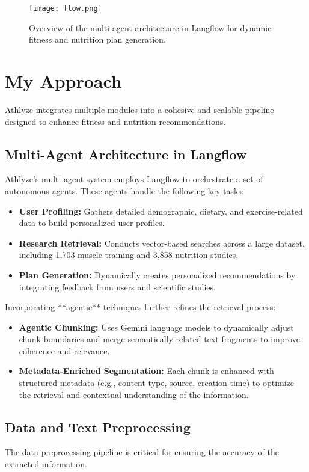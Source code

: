 \documentclass[conference]{IEEEtran}
\begin{document}
\begin{figure}[h]
\centering
\texttt{[image: flow.png]}
\caption{Overview of the multi-agent architecture in Langflow for dynamic fitness and nutrition plan generation.}
\label{fig:flow}
\end{figure}

\section{My Approach}
Athlyze integrates multiple modules into a cohesive and scalable pipeline designed to enhance fitness and nutrition recommendations.

\subsection{Multi-Agent Architecture in Langflow}
Athlyze's multi-agent system employs Langflow to orchestrate a set of autonomous agents. These agents handle the following key tasks:

\begin{itemize}
    \item \textbf{User Profiling:} Gathers detailed demographic, dietary, and exercise-related data to build personalized user profiles.
    \item \textbf{Research Retrieval:} Conducts vector-based searches across a large dataset, including 1,703 muscle training and 3,858 nutrition studies.
    \item \textbf{Plan Generation:} Dynamically creates personalized recommendations by integrating feedback from users and scientific studies.
\end{itemize}

Incorporating **agentic** techniques further refines the retrieval process:
\begin{itemize}
    \item \textbf{Agentic Chunking:} Uses Gemini language models to dynamically adjust chunk boundaries and merge semantically related text fragments to improve coherence and relevance.
    \item \textbf{Metadata-Enriched Segmentation:} Each chunk is enhanced with structured metadata (e.g., content type, source, creation time) to optimize the retrieval and contextual understanding of the information.
\end{itemize}

\subsection{Data and Text Preprocessing}
The data preprocessing pipeline is critical for ensuring the accuracy of the extracted information.
\end{document}

